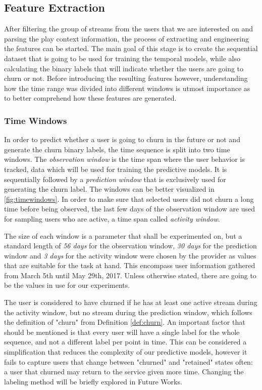 \documentclass{kththesis}
\begin{document}
\subsection{Feature Extraction}

After filtering the group of streams from the users that we are interested on and parsing the play context information, the process of extracting and engineering the features can be started. The main goal of this stage is to create the sequential dataset that is going to be used for training the temporal models, while also calculating the binary labels that will indicate whether the users are going to churn or not. Before introducing the resulting features however, understanding how the time range was divided into different windows is utmost importance as to better comprehend how these features are generated.

\subsubsection{Time Windows}

In order to predict whether a user is going to churn in the future or not and generate the churn binary labels, the time sequence is split into two time windows. The \emph{observation window} is the time span where the user behavior is tracked, data which will be used for training the predictive models. It is sequentially followed by a \emph{prediction window} that is exclusively used for generating the churn label. The windows can be better visualized in \autoref{fig:timewindows}. In order to make sure that selected users did not churn a long time before being observed, the last few days of the observation window are used for sampling users who are active, a time span called \emph{activity window}. 

The size of each window is a parameter that shall be experimented on, but a standard length of \emph{56 days} for the observation window, \emph{30 days} for the prediction window and \emph{3 days} for the activity window were chosen by the provider as values that are suitable for the task at hand. This encompass user information gathered from March 5th until May 29th, 2017. Unless otherwise stated, there are going to be the values in use for our experiments.

The user is considered to have churned if he has at least one active stream during the activity window, but no stream during the prediction window, which follows the definition of "churn" from Definition \autoref{def:churn}. An important factor that should be mentioned is that every user will have a single label for the whole sequence, and not a different label per point in time. This can be considered a simplification that reduces the complexity of our predictive models, however it fails to capture users that change between "churned" and "retained" states often: a user that churned may return to the service given more time. Changing the labeling method will be briefly explored in Future Works. 
\end{document}
